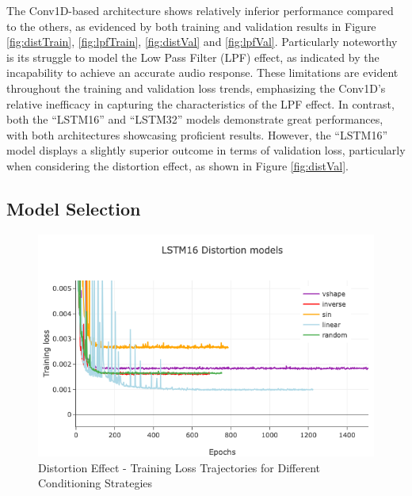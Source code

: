 \documentclass{article}
\newcommand{\quotes}[1]{``#1''}
\begin{document}
\begin{sloppy}
The Conv1D-based architecture shows relatively inferior performance compared to the others, as evidenced by both training and validation results in Figure \ref{fig:distTrain}, \ref{fig:lpfTrain}, \ref{fig:distVal} and \ref{fig:lpfVal}. Particularly noteworthy is its struggle to model the Low Pass Filter (LPF) effect, as indicated by the incapability to achieve an accurate audio response. These limitations are evident throughout the training and validation loss trends, emphasizing the Conv1D's relative inefficacy in capturing the characteristics of the LPF effect. In contrast, both the \quotes{LSTM16} and \quotes{LSTM32} models demonstrate great performances, with both architectures showcasing proficient results. However, the \quotes{LSTM16} model displays a slightly superior outcome in terms of validation loss, particularly when considering the distortion effect, as shown in Figure \ref{fig:distVal}.

\subsection{Model Selection}
\label{ssec:modelSelRes}

\begin{figure}[t]
  \centering
  \centerline{\includegraphics[width=\columnwidth]{./plots/trimmedImgs/dists trainLoss.png}}
  \caption{Distortion Effect - Training Loss Trajectories for Different Conditioning Strategies}
  \label{fig:distsTrain}
\end{figure}


\end{sloppy}
\end{document}
